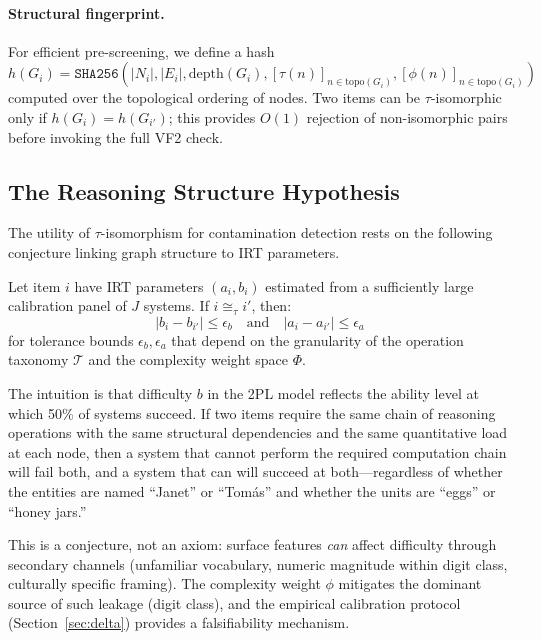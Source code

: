 \paragraph{Structural fingerprint.}
For efficient pre-screening, we define a hash
$h(G_i) = \texttt{SHA256}(|N_i|, |E_i|, \mathrm{depth}(G_i),
[\tau(n)]_{n \in \mathrm{topo}(G_i)},
[\phi(n)]_{n \in \mathrm{topo}(G_i)})$ computed over the topological
ordering of nodes. Two items can be $\tau$-isomorphic only if
$h(G_i) = h(G_{i'})$; this provides $O(1)$ rejection of non-isomorphic
pairs before invoking the full VF2 check.


\subsection{The Reasoning Structure Hypothesis}
\label{sec:hypothesis}

The utility of $\tau$-isomorphism for contamination detection rests on
the following conjecture linking graph structure to IRT parameters.

\begin{conjecture}
\label{conj:rsh}
Let item $i$ have IRT parameters $(a_i, b_i)$ estimated from a
sufficiently large calibration panel of $J$ systems. If
$i \cong_\tau i'$, then:
\begin{equation}
|b_i - b_{i'}| \leq \epsilon_b
\quad \text{and} \quad
|a_i - a_{i'}| \leq \epsilon_a
\label{eq:rsh}
\end{equation}
for tolerance bounds $\epsilon_b, \epsilon_a$ that depend on the
granularity of the operation taxonomy $\mathcal{T}$ and the complexity
weight space $\Phi$.
\end{conjecture}

\noindent
The intuition is that difficulty $b$ in the 2PL model reflects the
ability level at which 50\% of systems succeed. If two items require
the same chain of reasoning operations with the same structural
dependencies and the same quantitative load at each node, then a system
that cannot perform the required computation chain will fail both, and a
system that can will succeed at both---regardless of whether the
entities are named ``Janet'' or ``Tom\'{a}s'' and whether the units are
``eggs'' or ``honey jars.''

This is a conjecture, not an axiom: surface features \emph{can} affect
difficulty through secondary channels (unfamiliar vocabulary, numeric
magnitude within digit class, culturally specific framing). The
complexity weight $\phi$ mitigates the dominant source of such leakage
(digit class), and the empirical calibration protocol
(Section~\ref{sec:delta}) provides a falsifiability mechanism.


